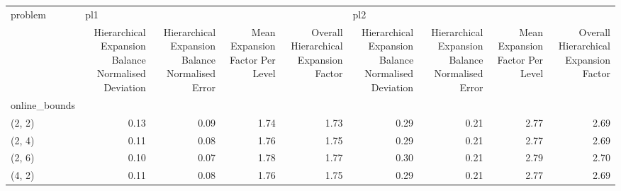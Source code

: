 \begin{tabular}{lrrrrrrrr}
\toprule
problem & \multicolumn{4}{l}{pl1} & \multicolumn{4}{l}{pl2} \\
{} & Hierarchical Expansion Balance Normalised Deviation & Hierarchical Expansion Balance Normalised Error & Mean Expansion Factor Per Level & Overall Hierarchical Expansion Factor & Hierarchical Expansion Balance Normalised Deviation & Hierarchical Expansion Balance Normalised Error & Mean Expansion Factor Per Level & Overall Hierarchical Expansion Factor \\
online\_bounds &                                                     &                                                 &                                 &                                       &                                                     &                                                 &                                 &                                       \\
\midrule
(2, 2)        &                                               0.13 &                                            0.09 &                            1.74 &                                  1.73 &                                               0.29 &                                            0.21 &                            2.77 &                                  2.69 \\
(2, 4)        &                                               0.11 &                                            0.08 &                            1.76 &                                  1.75 &                                               0.29 &                                            0.21 &                            2.77 &                                  2.69 \\
(2, 6)        &                                               0.10 &                                            0.07 &                            1.78 &                                  1.77 &                                               0.30 &                                            0.21 &                            2.79 &                                  2.70 \\
(4, 2)        &                                               0.11 &                                            0.08 &                            1.76 &                                  1.75 &                                               0.29 &                                            0.21 &                            2.77 &                                  2.69 \\

\end{tabular}
